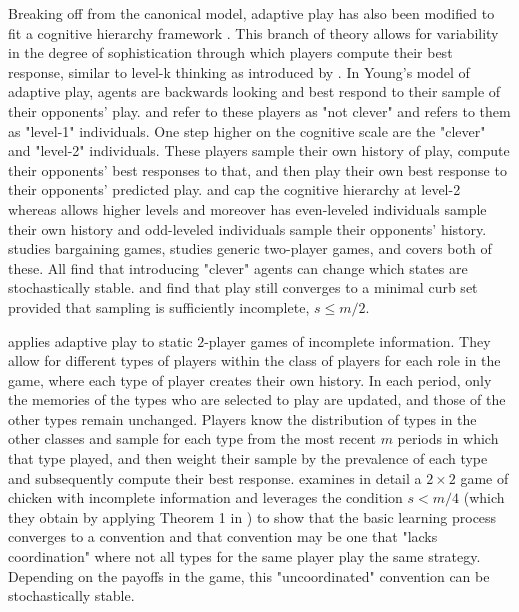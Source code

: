 \documentclass[11.5pt]{article}
\begin{document}
Breaking off from the canonical model, adaptive play has also been modified to fit a cognitive hierarchy framework \citep{saez1999clever, matros2003clever, khan2014cognitive}. This branch of theory allows for variability in the degree of sophistication through which players compute their best response, similar to level-k thinking as introduced by \cite{nagel1995unraveling}. In Young's model of adaptive play, agents are backwards looking and best respond to their sample of their opponents' play. \cite{saez1999clever} and \cite{matros2003clever} refer to these players as "not clever" and \cite{khan2014cognitive} refers to them as "level-1" individuals. One step higher on the cognitive scale are the "clever" and "level-2" individuals. These players sample their own history of play, compute their 
opponents' best responses to that, and then play their own best response to their opponents' predicted play. 
\cite{saez1999clever} and \cite{matros2003clever} cap the cognitive hierarchy at level-2 whereas \cite{khan2014cognitive} allows higher levels and moreover has even-leveled individuals sample their own history and odd-leveled individuals sample their opponents' history. 
\cite{saez1999clever} studies bargaining games, \cite{matros2003clever} studies generic two-player games, and \cite{khan2014cognitive} covers both of these. All find that introducing "clever" agents can change which states are stochastically stable. \cite{matros2003clever} and \cite{khan2014cognitive} find that play still converges to a minimal curb set provided that sampling is sufficiently incomplete, $s \leq m/2$.

\cite{jensen2005evolution} applies adaptive play to static $2$-player games of incomplete information. They allow for different types of players within the class of players for each role in the game, where  each type of player creates their own history. In each period, only the memories of the types who are selected to play are updated, and those of the other types remain unchanged. Players know the distribution of types in the other classes and sample for each type from the most recent $m$ periods in which that type played, and then weight their sample by the prevalence of each type and subsequently compute their best response. 
\cite{jensen2005evolution} examines in detail a $2\times 2$ game of chicken with incomplete information and leverages the condition $s<m/4$ (which they obtain by applying Theorem 1 in  \cite{young1993evolution})
to show that the basic learning process converges to a convention and that convention may be one that "lacks coordination" where not all types for the same player play the same strategy. Depending on the payoffs in the game, this "uncoordinated" convention can be stochastically stable. 
\end{document}
